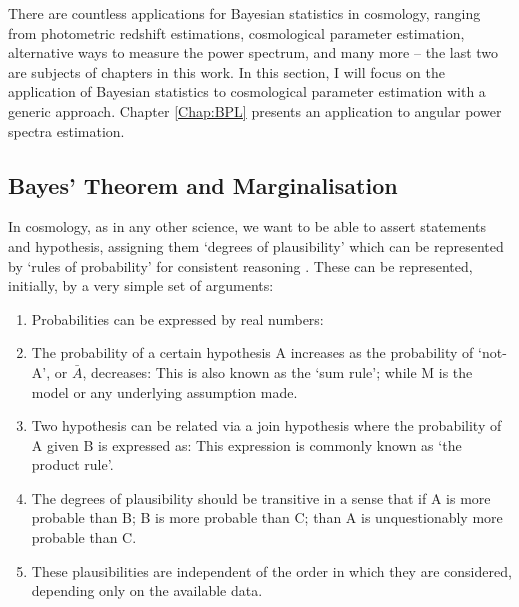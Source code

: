 \qquad There are countless applications for Bayesian statistics in cosmology, ranging from photometric redshift estimations, cosmological parameter estimation, alternative ways to measure the power spectrum, and many more -- the last two are subjects of chapters in this work. In this section, I will focus on the application of Bayesian statistics to cosmological parameter estimation with a generic approach. Chapter \ref{Chap:BPL} presents an application to angular power spectra estimation.


\subsection{Bayes' Theorem and Marginalisation}
In cosmology, as in any other science, we want to be able to assert statements and hypothesis, assigning them `degrees of plausibility' which can be represented by `rules of probability' for consistent reasoning \citep{sivia2006data}. These can be represented, initially, by a very simple set of arguments:
\begin{enumerate}
\item Probabilities can be expressed by real numbers:
\item The probability of a certain hypothesis A increases as the probability of `not-A', or $\bar{A}$, decreases:
This is also known as the `sum rule'; while M is the model or any underlying assumption made.
\item Two hypothesis can be related via a join hypothesis where the probability of A given B is expressed as:
This expression is commonly known as `the product rule'.
\item The degrees of plausibility should be transitive in a sense that if A is more probable than B; B is more probable than C; than A is unquestionably more probable than C.

\item These plausibilities are independent of the order in which they are considered, depending only on the available data.
\end{enumerate}

